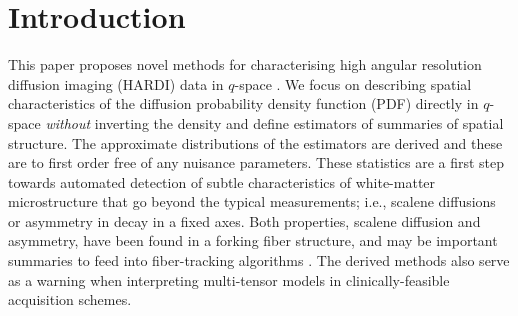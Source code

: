 \documentclass[dvips,aoas,preprint]{imsart}
\numberwithin{equation}{section}
\theoremstyle{plain}
\begin{document}
\begin{frontmatter}

\begin{keyword}
\end{keyword}

\end{frontmatter}

\section{Introduction}
\label{intro}

This paper proposes novel methods for characterising high angular
resolution diffusion imaging (HARDI) data in $q$-space
\citep{tuc-etal:high}.  We focus on describing spatial characteristics
of the diffusion probability density function (PDF) directly in
$q$-space {\em without} inverting the density and define estimators of
summaries of spatial structure.  The approximate distributions of the
estimators are derived and these are to first order free of any
nuisance parameters.  These statistics are a first step towards
automated detection of subtle characteristics of white-matter
microstructure that go beyond the typical measurements; i.e., scalene
diffusions or asymmetry in decay in a fixed axes.  Both properties,
scalene diffusion and asymmetry, have been found in a forking fiber
structure, and may be important summaries to feed into fiber-tracking
algorithms \citep{mor-zij:fiber-tracking}.  The derived methods also
serve as a warning when interpreting multi-tensor models in
clinically-feasible acquisition schemes.
\end{document}
